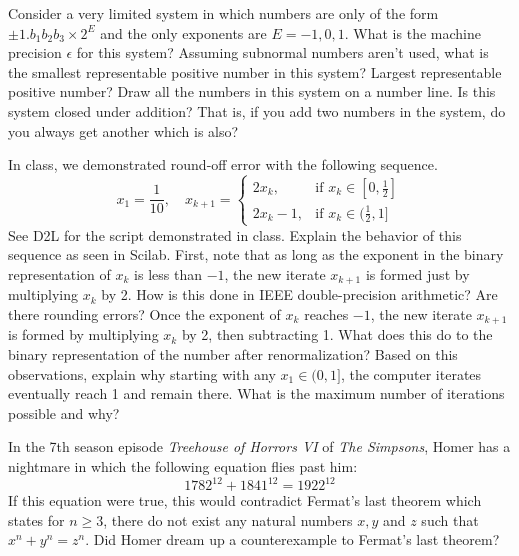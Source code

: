 \documentclass[addpoints, 11pt]{exam}
\newcommand{\ds}{\displaystyle}
\begin{document}
\begin{questions}
\question Consider a very limited system in which numbers are only of the form $\pm 1.b_1b_2b_3 \times 2^E$ and the only exponents are $E=-1,0,1$. What is the machine precision $\epsilon$ for this system? Assuming subnormal numbers aren't used, what is the smallest representable positive number in this system? Largest representable positive number? Draw all the numbers in this system on a number line. Is this system closed under addition? That is, if you add two numbers in the system, do you always get another which is also?

\question In class, we demonstrated round-off error with the following sequence.
\[
x_1 = \frac{1}{10}, \quad x_{k+1}=
\begin{cases}
2x_k, & \text{if } x_k \in [0,\frac{1}{2}] \\
2x_k-1, & \text{if } x_k \in (\frac{1}{2},1]
\end{cases}
\]
See D2L for the script demonstrated in class. Explain the behavior of this sequence as seen in Scilab. First, note that as long as the exponent in the binary representation of $x_k$ is less than $-1$, the new iterate $x_{k+1}$ is formed just by multiplying $x_k$ by 2. How is this done in IEEE double-precision arithmetic? Are there rounding errors? Once the exponent of $x_k$ reaches $-1$, the new iterate $x_{k+1}$ is formed by multiplying $x_k$ by 2, then subtracting 1. What does this do to the binary representation of the number after renormalization? Based on this observations, explain why starting with any $x_1\in (0,1]$, the computer iterates eventually reach 1 and remain there. What is the maximum number of iterations possible and why?

\question In the 7th season episode \emph{Treehouse of Horrors VI} of \emph{The Simpsons}, Homer has a nightmare in which the following equation flies past him:
\[
1782^{12}+1841^{12}=1922^{12}
\]
If this equation were true, this would contradict Fermat's last theorem which states for $n\geq 3$, there do not exist any natural numbers $x,y$ and $z$ such that $x^n+y^n=z^n$. Did Homer dream up a counterexample to Fermat's last theorem?
\end{questions}
\end{document}
